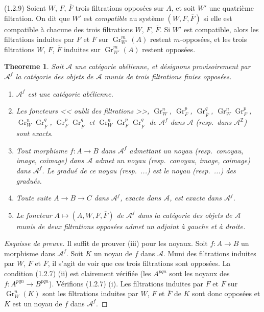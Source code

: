 \documentclass[11pt,a4paper]{amsart}
\theoremstyle{plain}
\newtheorem{theorem}{Theoreme}[section]
\theoremstyle{definition}
\theoremstyle{remark}
\DeclareMathOperator{\Gr}{Gr}
\newcommand{\sA}{\mathscr{A}}
\newcommand{\bZ}{\mathbb{Z}}
\numberwithin{equation}{subsection}
\begin{document}
(1.2.9) Soient $W$, $F$, $\overline{F}$ trois filtrations oppos\'ees sur $A$, et soit $W'$ une
quatri\`eme filtration. On dit que $W'$ est \emph{compatible} au syst\`eme $(W,F,\overline{F})$
si elle est compatible \`a chacune des trois filtrations $W$, $F$, $\overline{F}$. Si $W'$ est compatible,
alors les filtrations induites par $F$ et $\overline{F}$ sur $\Gr_{W'}^m(A)$ restent $m$-oppos\'ees,
et les trois filtrations $W$, $F$, $\overline{F}$ induites sur $\Gr_{W'}^m(A)$ restent oppos\'ees.

\begin{theorem}\label{thm:1.2.10}
Soit $\sA$ une cat\'egorie ab\'elienne, et d\'esignons provisoirement par $\sA^f$ la cat\'egorie
des objets de $\sA$ munis de trois filtrations finies oppos\'ees.
\begin{enumerate}
\item[(i)] $\sA^f$ est une cat\'egorie ab\'elienne.
\item[(ii)] Les foncteurs << oubli des filtrations >>, $\Gr_W^n$, $\Gr_F^p$, $\Gr_{\overline{F}}^q$,
$\Gr_W^n \Gr_F^p$, $\Gr_W^n \Gr_{\overline{F}}^q$, $\Gr_F^p \Gr_{\overline{F}}^q$ et $\Gr_W^n \Gr_F^p \Gr_{\overline{F}}^q$ de $\sA^f$ dans $\sA$
(resp.~dans $\sA^{\bZ}$) sont exacts.
\item[(iii)] Tout morphisme $f : A \to B$ dans $\sA^f$ admettant un noyau (resp.~conoyau,
image, coimage) dans $\sA$ admet un noyau (resp.~conoyau, image, coimage) dans $\sA^f$.
Le gradu\'e de ce noyau (resp.~...) est le noyau (resp.~...) des gradu\'es.
\item[(iv)] Toute suite $A \to B \to C$ dans $\sA^f$, exacte dans $\sA$, est exacte dans $\sA^f$.
\item[(v)] Le foncteur $A \mapsto (A, W, F, \overline{F})$ de $\sA^f$ dans la cat\'egorie des objets de $\sA$
munis de deux filtrations oppos\'ees admet un adjoint \`a gauche et \`a droite.
\end{enumerate}
\end{theorem}

\begin{proof}[Esquisse de preuve]
Il suffit de prouver (iii) pour les noyaux. Soit $f : A \to B$ un morphisme dans $\sA^f$.
Soit $K$ un noyau de $f$ dans $\sA$. Muni des filtrations induites par $W$, $F$ et $\overline{F}$,
il s'agit de voir que ces trois filtrations sont oppos\'ees. La condition (1.2.7) (ii) est
clairement v\'erifi\'ee (les $A^{pqn}$ sont les noyaux des $f : A^{pqn} \to B^{pqn}$). V\'erifions
(1.2.7) (i). Les filtrations induites par $F$ et $\overline{F}$ sur $\Gr_W^n(K)$ sont les filtrations
induites par $W$, $F$ et $\overline{F}$ de $K$ sont donc oppos\'ees et $K$ est un noyau de $f$ dans $\sA^f$.
\end{proof}
\end{document}
